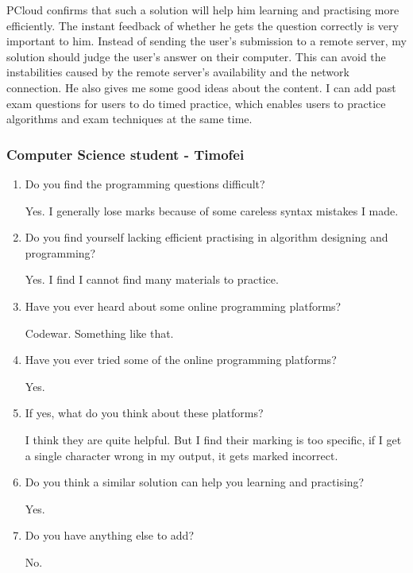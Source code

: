 \documentclass[a4paper]{report}
\begin{document}
PCloud confirms that such a solution will help him learning and practising more efficiently. The instant feedback of whether he gets the question correctly is very important to him. Instead of sending the user's submission to a remote server, my solution should judge the user's answer on their computer. This can avoid the instabilities caused by the remote server's availability and the network connection. He also gives me some good ideas about the content. I can add past exam questions for users to do timed practice, which enables users to practice algorithms and exam techniques at the same time.

\subsubsection{Computer Science student - Timofei}

\begin{enumerate}

    \item Do you find the programming questions difficult?

    Yes. I generally lose marks because of some careless syntax mistakes I made.

    \item Do you find yourself lacking efficient practising in algorithm designing and programming?

    Yes. I find I cannot find many materials to practice.

    \item Have you ever heard about some online programming platforms?

    Codewar. Something like that.

    \item Have you ever tried some of the online programming platforms?

    Yes.

    \item If yes, what do you think about these platforms?

    I think they are quite helpful. But I find their marking is too specific, if I get a single character wrong in my output, it gets marked incorrect. 

    \item Do you think a similar solution can help you learning and practising?

    Yes.

    \item Do you have anything else to add?

    No.

\end{enumerate}
\end{document}
